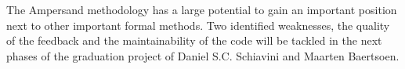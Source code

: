 The Ampersand methodology has a large potential to gain an important position next to other important formal methods. 
Two identified weaknesses, the quality of the feedback and the maintainability of the code will be tackled in the next phases of the graduation project of  Daniel S.C. Schiavini and Maarten Baertsoen.






